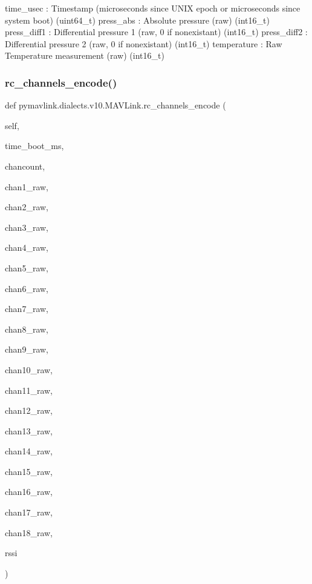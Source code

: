 \begin{DoxyVerb}
\begin{DoxyVerb}
\begin{DoxyVerb}
\begin{DoxyVerb}
\begin{DoxyVerb}
time_usec                 : Timestamp (microseconds since UNIX epoch or microseconds since system boot) (uint64_t)
press_abs                 : Absolute pressure (raw) (int16_t)
press_diff1               : Differential pressure 1 (raw, 0 if nonexistant) (int16_t)
press_diff2               : Differential pressure 2 (raw, 0 if nonexistant) (int16_t)
temperature               : Raw Temperature measurement (raw) (int16_t)\end{DoxyVerb}
 \mbox{\label{classpymavlink_1_1dialects_1_1v10_1_1MAVLink_a5ad3cc42fd8323b455ea8ac844057eb1}} 
\subsubsection{\texorpdfstring{rc\+\_\+channels\+\_\+encode()}{rc\_channels\_encode()}}
{\footnotesize\ttfamily def pymavlink.\+dialects.\+v10.\+M\+A\+V\+Link.\+rc\+\_\+channels\+\_\+encode (\begin{DoxyParamCaption}\item[{}]{self,  }\item[{}]{time\+\_\+boot\+\_\+ms,  }\item[{}]{chancount,  }\item[{}]{chan1\+\_\+raw,  }\item[{}]{chan2\+\_\+raw,  }\item[{}]{chan3\+\_\+raw,  }\item[{}]{chan4\+\_\+raw,  }\item[{}]{chan5\+\_\+raw,  }\item[{}]{chan6\+\_\+raw,  }\item[{}]{chan7\+\_\+raw,  }\item[{}]{chan8\+\_\+raw,  }\item[{}]{chan9\+\_\+raw,  }\item[{}]{chan10\+\_\+raw,  }\item[{}]{chan11\+\_\+raw,  }\item[{}]{chan12\+\_\+raw,  }\item[{}]{chan13\+\_\+raw,  }\item[{}]{chan14\+\_\+raw,  }\item[{}]{chan15\+\_\+raw,  }\item[{}]{chan16\+\_\+raw,  }\item[{}]{chan17\+\_\+raw,  }\item[{}]{chan18\+\_\+raw,  }\item[{}]{rssi }\end{DoxyParamCaption})}


\end{DoxyVerb}
\end{DoxyVerb}
\end{DoxyVerb}
\end{DoxyVerb}
